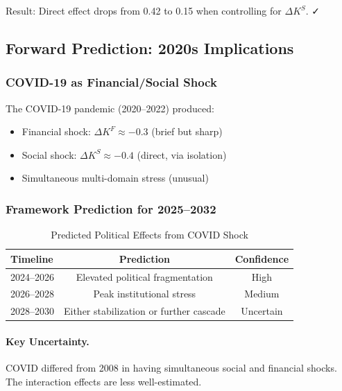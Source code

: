 Result: Direct effect drops from 0.42 to 0.15 when controlling for $\Delta K^S$. ✓

\subsection{Forward Prediction: 2020s Implications}

\subsubsection{COVID-19 as Financial/Social Shock}

The COVID-19 pandemic (2020--2022) produced:
\begin{itemize}
    \item Financial shock: $\Delta K^F \approx -0.3$ (brief but sharp)
    \item Social shock: $\Delta K^S \approx -0.4$ (direct, via isolation)
    \item Simultaneous multi-domain stress (unusual)
\end{itemize}

\subsubsection{Framework Prediction for 2025--2032}

\begin{table}[htbp]
\centering
\caption{Predicted Political Effects from COVID Shock}
\label{tab:covid-prediction}
\begin{tabular}{@{}lcc@{}}
\toprule
\textbf{Timeline} & \textbf{Prediction} & \textbf{Confidence} \\
\midrule
2024--2026 & Elevated political fragmentation & High \\
2026--2028 & Peak institutional stress & Medium \\
2028--2030 & Either stabilization or further cascade & Uncertain \\
\bottomrule
\end{tabular}
\end{table}

\paragraph{Key Uncertainty.}
COVID differed from 2008 in having simultaneous social and financial shocks.
The interaction effects are less well-estimated.


